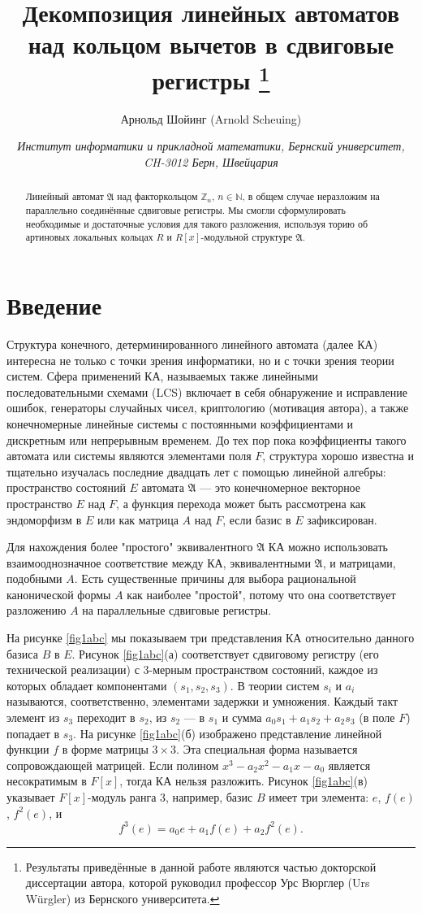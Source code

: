 \documentclass[a4paper,12pt]{article}
\title{Декомпозиция линейных автоматов над кольцом вычетов в сдвиговые регистры \protect\footnote{Результаты приведённые в данной работе являются частью докторской диссертации автора, которой руководил профессор Урс Вюрглер (Urs Würgler) из Бернского университета.}}
\author{Арнольд Шойинг (Arnold Scheuing)}
\date{\textit{\scriptsize{Институт информатики и прикладной математики, Бернский университет, CH-3012 Берн, Швейцария}}}
\begin{document}
\maketitle

\begin{abstract}
	Линейный автомат $\mathfrak{A}$ над факторкольцом $\mathbb{Z}_{n}$, $n \in \mathbb{N}$, в общем случае неразложим на параллельно соединённые сдвиговые регистры. Мы смогли сформулировать необходимые и достаточные условия для такого разложения, используя торию об артиновых локальных кольцах $R$ и $R[x]$-модульной структуре $\mathfrak{A}$.

\end{abstract}

\section{Введение}

Структура конечного, детерминированного линейного автомата (далее КА) интересна не только с точки зрения информатики, но и с точки зрения теории систем. Сфера применений КА, называемых также линейными последовательными схемами (LCS) включает в себя обнаружение и исправление ошибок, генераторы случайных чисел, криптологию (мотивация автора), а также конечномерные линейные системы с постоянными коэффициентами и дискретным или непрерывным временем. До тех пор пока коэффициенты такого автомата или системы являются элементами поля $F$, структура хорошо известна и тщательно изучалась последние двадцать лет \cite{bib4} с помощью линейной алгебры: пространство состояний $E$ автомата $\mathfrak{A}$ --- это конечномерное векторное пространство $E$ над $F$, а функция перехода может быть рассмотрена как эндоморфизм в $E$ или как матрица $A$ над $F$, если базис в $E$ зафиксирован.

Для нахождения более "простого" эквивалентного $\mathfrak{A}$ КА можно использовать взаимооднозначное соответствие между КА, эквивалентными $\mathfrak{A}$, и матрицами, подобными $A$. Есть существенные причины для выбора рациональной канонической формы $A$ как наиболее "простой", потому что она соответствует разложению $A$ на параллельные сдвиговые регистры.

На рисунке \ref{fig1abc} мы показываем три представления КА относительно данного базиса $B$ в $E$. Рисунок \ref{fig1abc}(а) соответствует сдвиговому регистру (его технической реализации) с 3-мерным пространством состояний, каждое из которых обладает компонентами $(s_1, s_2, s_3)$. В теории систем $s_i$ и $a_i$ называются, соответственно, элементами задержки и умножения. Каждый такт элемент из $s_3$ переходит в $s_2$, из $s_2$ --- в $s_1$ и сумма $a_0 s_1 + a_1 s_2 + a_2 s_3$ (в поле $F$) попадает в $s_3$. На рисунке \ref{fig1abc}(б) изображено представление линейной функции $f$ в форме матрицы $3 \times 3$. Эта специальная форма называется сопровождающей матрицей. Если полином $x^3 - a_2 x^2 - a_1 x - a_0$ является несократимым в $F[x]$, тогда КА нельзя разложить. Рисунок \ref{fig1abc}(в) указывает $F[x]$-модуль ранга 3, например, базис $B$ имеет три элемента: $e$, $f(e)$, $f^2(e)$, и
$$
f^3(e) = a_0 e + a_1 f(e) + a_2 f^2(e).
$$
\end{document}
